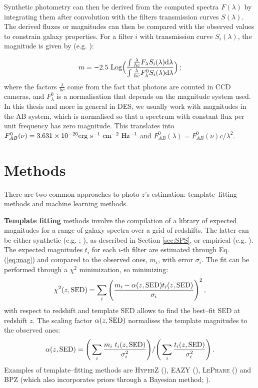 Synthetic photometry can then be derived from the computed spectra $F(\lambda)$ by integrating them after convolution with the filters transmission curves $S(\lambda)$. The derived fluxes or magnitudes can then be compared with the observed values to constrain galaxy properties. For a filter $i$ with transmission curve $S_i(\lambda)$, the magnitude is given by (e.g. \citealt{girardi}):

\begin{equation}
m =  -2.5~{\rm Log}\Big( \frac{\int\frac{\lambda}{hc}F_\lambda S_i(\lambda){\rm d} \lambda}{\int\frac{\lambda}{hc}F^0_\lambda S_i(\lambda){\rm d} \lambda} \Big)\, ;\label{eq:mag}
\end{equation}
where the factors $\frac{\lambda}{hc}$ come from the fact that photons are counted in CCD cameras, and $F^0_\lambda$ is a normalisation that depends on the magnitude system used. In this thesis and more in general in DES, we usually work with magnitudes in the AB system, which is normalised so that a spectrum with constant flux per unit frequency has zero magnitude. This translates into $F^0_{AB}(\nu)=3.631\times 10^{-20} {\rm erg~s^{-1}~cm^{-2}~Hz^{-1}}$ and $F^0_{AB}(\lambda)=F^0_{AB}(\nu)c/\lambda^2$.

\section{Methods}\label{sec:zmethods}
There are two common approaches to photo-$z$'s  estimation: template--fitting methods and machine learning methods. 

{\bf Template fitting} methods involve the compilation of a library of expected magnitudes for a range of galaxy spectra over a grid of redshifts. The latter can be either synthetic (e.g. \citealt{bc03}; \citealt{fsps}), as described in Section \ref{sec:SPS}, or empirical (e.g. \citealt{cww}). The expected magnitudes $t_i$ for each $i$-th filter are estimated through Eq. (\ref{eq:mag}) and compared to the observed ones, $m_i$, with error $\sigma_i$. The fit can be performed through a $\chi^2$ minimization, so minimizing:
\begin{equation}
\chi^2(z,{\rm SED})=\sum_i \Bigg( \frac{m_i-\alpha(z,{\rm SED}) t_i(z,{\rm SED}) }{\sigma_i} \Bigg)^2 \,,
\end{equation}
with respect to redshift and template SED allows to find the best--fit SED at redshift $z$. The scaling factor $\alpha(z,{\rm SED})$ normalises the template magnitudes to the observed ones:
\begin{equation}
\alpha (z,{\rm SED})=\Bigg( \sum_i \frac{m_i~t_i(z,{\rm SED}) }{\sigma_i^2} \Bigg)/ \Bigg( \sum_i  \frac{t_i(z,{\rm SED}) }{\sigma_i^2} \Bigg) \,.
\end{equation}
Examples of template--fitting methods are \textsc{HyperZ} (\citealt{hyperz}), \textsc{EAZY} (\citealt{eazy}), \textsc{LePhare} (\citealt{ilbertlephare}) and BPZ (which also incorporates priors through a Bayesian method; \citealt{bpz}).

